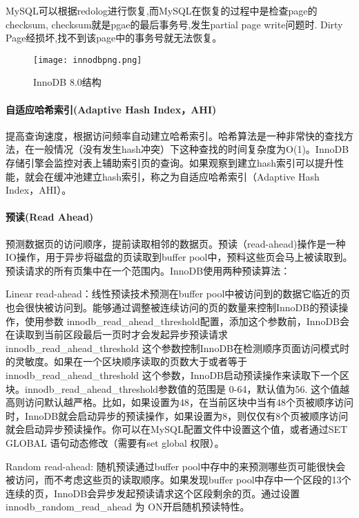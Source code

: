 \documentclass[../../../interview-questions.tex]{subfiles}
\begin{document}
MySQL可以根据redolog进行恢复,而MySQL在恢复的过程中是检查page的checksum, checksum就是pgae的最后事务号,发生partial page write问题时. Dirty Page经损坏,找不到该page中的事务号就无法恢复。

\begin{figure}[htbp]
    \centering
    \texttt{[image: innodbpng.png]}
    \caption{InnoDB 8.0结构}
    \label{fig:innodbpng}
\end{figure}


\paragraph{自适应哈希索引(Adaptive Hash Index，AHI)}

提高查询速度，根据访问频率自动建立哈希索引。哈希算法是一种非常快的查找方法，在一般情况（没有发生hash冲突）下这种查找的时间复杂度为O(1)。InnoDB存储引擎会监控对表上辅助索引页的查询。如果观察到建立hash索引可以提升性能，就会在缓冲池建立hash索引，称之为自适应哈希索引（Adaptive Hash Index，AHI）。

\paragraph{预读(Read Ahead)}

预测数据页的访问顺序，提前读取相邻的数据页。预读（read-ahead)操作是一种IO操作，用于异步将磁盘的页读取到buffer pool中，预料这些页会马上被读取到。预读请求的所有页集中在一个范围内。InnoDB使用两种预读算法：

Linear read-ahead：线性预读技术预测在buffer pool中被访问到的数据它临近的页也会很快被访问到。能够通过调整被连续访问的页的数量来控制InnoDB的预读操作，使用参数 innodb\_read\_ahead\_threshold配置，添加这个参数前，InnoDB会在读取到当前区段最后一页时才会发起异步预读请求
innodb\_read\_ahead\_threshold 这个参数控制InnoDB在检测顺序页面访问模式时的灵敏度。如果在一个区块顺序读取的页数大于或者等于 innodb\_read\_ahead\_threshold 这个参数，InnoDB启动预读操作来读取下一个区块。innodb\_read\_ahead\_threshold参数值的范围是 0-64，默认值为56. 这个值越高则访问默认越严格。比如，如果设置为48，在当前区块中当有48个页被顺序访问时，InnoDB就会启动异步的预读操作，如果设置为8，则仅仅有8个页被顺序访问就会启动异步预读操作。你可以在MySQL配置文件中设置这个值，或者通过SET GLOBAL 语句动态修改（需要有set global 权限）。

Random read-ahead: 随机预读通过buffer pool中存中的来预测哪些页可能很快会被访问，而不考虑这些页的读取顺序。如果发现buffer pool中存中一个区段的13个连续的页，InnoDB会异步发起预读请求这个区段剩余的页。通过设置 innodb\_random\_read\_ahead 为 ON开启随机预读特性。
\end{document}
